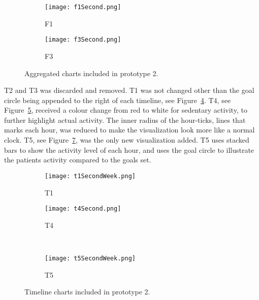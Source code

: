 \begin{figure}[h!]
  \centering
  \begin{subfigure}[b]{0.45\textwidth}
    \centering
    \texttt{[image: f1Second.png]}
    \caption{F1}
    \label{fig:f1Second}
  \end{subfigure}
  \begin{subfigure}[b]{0.45\textwidth}
    \centering
    \texttt{[image: f3Second.png]}
    \caption{F3}
    \label{fig:f3Second}
  \end{subfigure}
  \caption[Second version of F1 and F3]{Aggregated charts included in prototype 2.}
  \label{fig:aggCharts}
\end{figure}

T2 and T3 was discarded and removed. T1 was not changed other than the goal circle being appended to the right of each timeline, see Figure~\ref{fig:t1}. T4, see Figure~\ref{fig:t4}, received a colour change from red to white for sedentary activity, to further highlight actual activity. The inner radius of the hour-ticks, lines that marks each hour, was reduced to make the visualization look more like a normal clock. T5, see Figure~\ref{fig:t5}, was the only new visualization added. T5 uses stacked bars to show the activity level of each hour, and uses the goal circle to illustrate the patients activity compared to the goals set.

\begin{figure}[h!]
  \centering
  \begin{subfigure}[b]{0.6\textwidth}
    \centering
    \texttt{[image: t1SecondWeek.png]}
    \caption{T1}
    \label{fig:t1}
  \end{subfigure}
  \begin{subfigure}[b]{0.35\textwidth}
    \centering
    \texttt{[image: t4Second.png]}
    \caption{T4}
    \label{fig:t4}
  \end{subfigure}
  \\
  \begin{subfigure}[b]{0.95\textwidth}
    \centering
    \texttt{[image: t5SecondWeek.png]}
    \caption{T5}
    \label{fig:t5}
  \end{subfigure}
  \caption[Second version of T1, T4 and first version of T5]{Timeline charts included in prototype 2.}
\end{figure}
